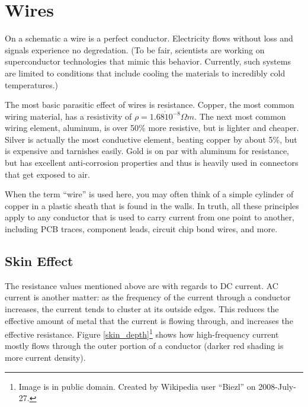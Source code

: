 \section{Wires}

On a schematic a wire is a perfect conductor. Electricity flows without loss and signals experience no degredation. (To be fair, scientists are working on superconductor technologies that mimic this behavior. Currently, such systems are limited to conditions that include cooling the materials to incredibly cold temperatures.)

The most basic parasitic effect of wires is resistance. Copper, the most common wiring material, has a resistivity of $\rho = 1.68 \dot 10^{-8} \Omega m$. The next most common wiring element, aluminum, is over 50\% more resistive, but is lighter and cheaper. Silver is actually the most conductive element, beating copper by about 5\%, but is expensive and tarnishes easily. Gold is on par with aluminum for resistance, but has excellent anti-corrosion properties and thus is heavily used in connectors that get exposed to air.

When the term ``wire'' is used here, you may often think of a simple cylinder of copper in a plastic sheath that is found in the walls. In truth, all these principles apply to any conductor that is used to carry current from one point to another, including PCB traces, component leads, circuit chip bond wires, and more.

\subsection{Skin Effect}

The resistance values mentioned above are with regards to DC current. AC current is another matter: as the frequency of the current through a conductor increases, the current tends to cluster at its outside edges. This reduces the effective amount of metal that the current is flowing through, and increases the effective resistance. Figure \ref{skin_depth}\footnote{Image is in public domain. Created by Wikipedia user ``Biezl'' on 2008-July-27.} shows how high-frequency current mostly flows through the outer portion of a conductor (darker red shading is more current density).

